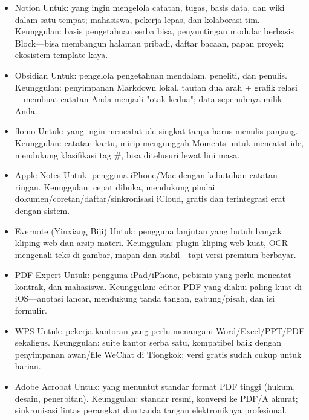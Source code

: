 \begin{itemize}
  \item Notion Untuk: yang ingin mengelola catatan, tugas, basis data, dan wiki dalam satu tempat; mahasiswa, pekerja lepas, dan kolaborasi tim. Keunggulan: basis pengetahuan serba bisa, penyuntingan modular berbasis Block—bisa membangun halaman pribadi, daftar bacaan, papan proyek; ekosistem template kaya.
  \item Obsidian Untuk: pengelola pengetahuan mendalam, peneliti, dan penulis. Keunggulan: penyimpanan Markdown lokal, tautan dua arah + grafik relasi—membuat catatan Anda menjadi "otak kedua"; data sepenuhnya milik Anda.
  \item flomo Untuk: yang ingin mencatat ide singkat tanpa harus menulis panjang. Keunggulan: catatan kartu, mirip mengunggah Moments untuk mencatat ide, mendukung klasifikasi tag \#, bisa ditelusuri lewat lini masa.
  \item Apple Notes Untuk: pengguna iPhone/Mac dengan kebutuhan catatan ringan. Keunggulan: cepat dibuka, mendukung pindai dokumen/coretan/daftar/sinkronisasi iCloud, gratis dan terintegrasi erat dengan sistem.
  \item Evernote (Yinxiang Biji) Untuk: pengguna lanjutan yang butuh banyak kliping web dan arsip materi. Keunggulan: plugin kliping web kuat, OCR mengenali teks di gambar, mapan dan stabil—tapi versi premium berbayar.
\end{itemize}


\begin{itemize}
  \item PDF Expert Untuk: pengguna iPad/iPhone, pebisnis yang perlu mencatat kontrak, dan mahasiswa. Keunggulan: editor PDF yang diakui paling kuat di iOS—anotasi lancar, mendukung tanda tangan, gabung/pisah, dan isi formulir.
  \item WPS Untuk: pekerja kantoran yang perlu menangani Word/Excel/PPT/PDF sekaligus. Keunggulan: suite kantor serba satu, kompatibel baik dengan penyimpanan awan/file WeChat di Tiongkok; versi gratis sudah cukup untuk harian.
  \item Adobe Acrobat Untuk: yang menuntut standar format PDF tinggi (hukum, desain, penerbitan). Keunggulan: standar resmi, konversi ke PDF/A akurat; sinkronisasi lintas perangkat dan tanda tangan elektroniknya profesional.
\end{itemize}


